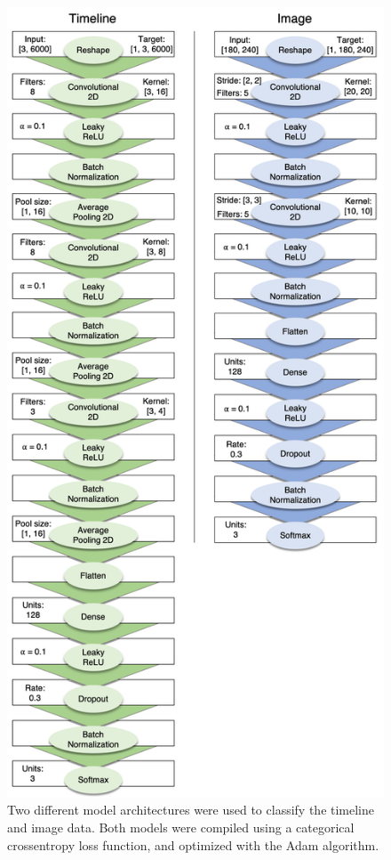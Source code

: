 \documentclass[
  english,
  man,floatsintext]{apa6}
\begin{document}
\begin{figure}
\centering
\includegraphics{figures/models.png}
\caption{\label{fig:models}Two different model architectures were used to classify the timeline and image data. Both models were compiled using a categorical crossentropy loss function, and optimized with the Adam algorithm.}
\end{figure}
\end{document}
